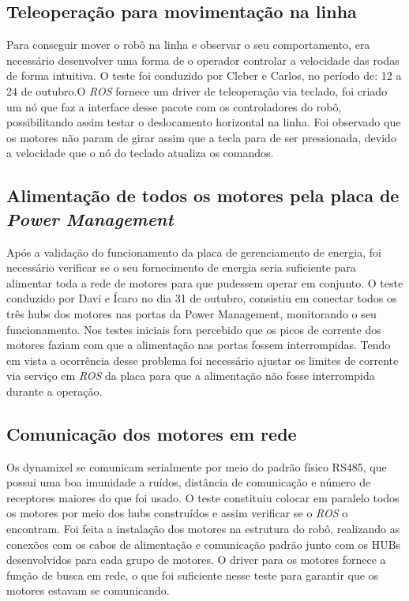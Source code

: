 \subsection{Teleoperação para movimentação na linha}
Para conseguir mover o robô na linha e observar o seu comportamento, era necessário desenvolver uma forma de o operador controlar a velocidade das rodas de forma intuitiva. O teste foi conduzido por Cleber e Carlos, no período de: 12 a 24 de outubro.O \textit{ROS} fornece um driver de teleoperação via teclado, foi criado um nó que faz a interface desse pacote com os controladores do robô, possibilitando assim testar o deslocamento horizontal na linha. Foi observado que os motores não param de girar assim que a tecla para de ser pressionada, devido a velocidade que o nó do teclado atualiza os comandos.

\subsection{Alimentação de todos os motores pela placa de \textit{Power Management}}
Após a validação do funcionamento da placa de gerenciamento de energia, foi necessário verificar se o seu fornecimento de energia seria suficiente para alimentar toda a rede de motores para que pudessem operar em conjunto. O teste conduzido por Davi e Ícaro no dia 31 de outubro, consistiu em conectar todos os três hubs dos motores nas portas da Power Management, monitorando o seu funcionamento. Nos testes iniciais fora percebido que os picos de corrente dos motores faziam com que a alimentação nas portas fossem interrompidas. Tendo em vista a ocorrência desse problema foi necessário ajustar os limites de corrente via serviço em \textit{ROS} da placa para que a alimentação não fosse interrompida durante a operação.

\subsection{Comunicação dos motores em rede}
Os dynamixel se comunicam serialmente por meio do padrão físico RS485, que possui uma boa imunidade a ruídos, distância de comunicação e número de receptores maiores do que foi usado. O teste constituiu colocar em paralelo todos os motores por meio dos hubs construídos e assim verificar se o \textit{ROS} o encontram. Foi feita a instalação dos motores na estrutura do robô, realizando as conexões com os cabos de alimentação e comunicação padrão junto com os HUBs desenvolvidos para cada grupo de motores. O driver para os motores fornece a função de busca em rede, o que foi suficiente nesse teste para garantir que os motores estavam se comunicando.

